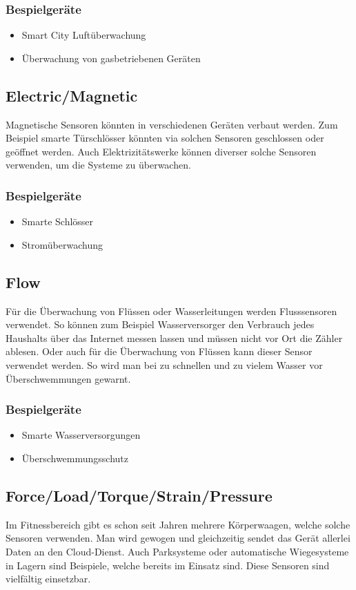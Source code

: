 \subsubsection{Bespielgeräte}
\begin{itemize}
\item	Smart City Luftüberwachung
\item	Überwachung von gasbetriebenen Geräten
\end{itemize}


\subsection{Electric/Magnetic}
Magnetische Sensoren könnten in verschiedenen Geräten verbaut werden. Zum Beispiel smarte Türschlösser könnten via solchen Sensoren geschlossen oder geöffnet werden. Auch Elektrizitätswerke können diverser solche Sensoren verwenden, um die Systeme zu überwachen.
\subsubsection{Bespielgeräte}
\begin{itemize}
\item	Smarte Schlösser
\item	Stromüberwachung
\end{itemize}


\subsection{Flow}%
Für die Überwachung von Flüssen oder Wasserleitungen werden Flusssensoren verwendet. So können zum Beispiel Wasserversorger den Verbrauch jedes Haushalts über das Internet messen lassen und müssen nicht vor Ort die Zähler ablesen. Oder auch für die Überwachung von Flüssen kann dieser Sensor verwendet werden. So wird man bei zu schnellen und zu vielem Wasser vor Überschwemmungen gewarnt.
\subsubsection{Bespielgeräte}
\begin{itemize}
\item	Smarte Wasserversorgungen
\item	Überschwemmungsschutz
\end{itemize}


\subsection{Force/Load/Torque/Strain/Pressure}%
Im Fitnessbereich gibt es schon seit Jahren mehrere Körperwaagen, welche solche Sensoren verwenden. Man wird gewogen und gleichzeitig sendet das Gerät allerlei Daten an den Cloud-Dienst. Auch Parksysteme oder automatische Wiegesysteme in Lagern sind Beispiele, welche bereits im Einsatz sind. Diese Sensoren sind vielfältig einsetzbar.
